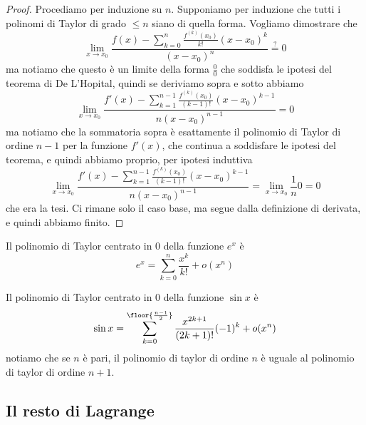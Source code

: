 \documentclass[11pt]{scrartcl}
\begin{document}
	\begin{proof} 
		Procediamo per induzione su $n$. Supponiamo per induzione che tutti i polinomi di Taylor di grado $\le n$ siano di quella forma. Vogliamo dimostrare che 
		$$\lim_{x\to x_0}\frac{f(x)-\sum_{k=0}^n\frac{f^{(k)}(x_0)}{k!}(x-x_0)^k}{(x-x_0)^n}\overset{?}{=}0$$
		ma notiamo che questo è un limite della forma $\frac{0}{0}$ che soddisfa le ipotesi del teorema di De L'Hopital, quindi se deriviamo sopra e sotto abbiamo
		$$\lim_{x\to x_0}\frac{f'(x)-\sum_{k=1}^{n-1}\frac{f^{(k)}(x_0)}{(k-1)!}(x-x_0)^{k-1}}{n(x-x_0)^{n-1}}=0$$
		ma notiamo che la sommatoria sopra è esattamente il polinomio di Taylor di ordine $n-1$ per la funzione $f'(x)$, che continua a soddisfare le ipotesi del teorema, e quindi abbiamo proprio, per ipotesi induttiva
		$$\lim_{x\to x_0}\frac{f'(x)-\sum_{k=1}^{n-1}\frac{f^{(k)}(x_0)}{(k-1)!}(x-x_0)^{k-1}}{n(x-x_0)^{n-1}}=\lim_{x\to x_0}\frac{1}{n}0=0$$
		che era la tesi. Ci rimane solo il caso base, ma segue dalla definizione di derivata, e quindi abbiamo finito.
	\end{proof}
	\begin{example}
		Il polinomio di Taylor centrato in $0$ della funzione $e^x$ è
		$$e^x=\sum_{k=0}^{n}\frac{x^k}{k!}+o(x^n)$$
	\end{example}
	\begin{example}
		Il polinomio di Taylor centrato in $0$ della funzione $\sin x$ è
		$$\sin x=\sum_{k=0}^{\floor{\frac{n-1}{2}}}\frac{x^{2k+1}}{(2k+1)!}(-1)^k+o(x^n)$$
		notiamo che se $n$ è pari, il polinomio di taylor di ordine $n$ è uguale al polinomio di taylor di ordine $n+1$.
	\end{example}
	\subsection{Il resto di Lagrange}
	
\end{document}
